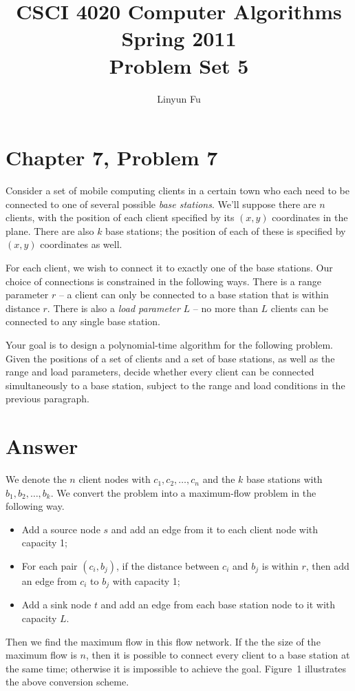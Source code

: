\documentclass[12pt,letterpaper]{article}
\author{Linyun Fu}
\title{CSCI 4020 Computer Algorithms Spring 2011\\
Problem Set 5}
\begin{document}
\maketitle
\section*{Chapter 7, Problem 7}
Consider a set of mobile computing clients in a certain town who each
need to be connected to one of several possible \emph{base stations}. We'll
suppose there are $n$ clients, with the position of each client specified
by its $(x, y)$ coordinates in the plane. There are also $k$ base stations; the
position of each of these is specified by $(x, y)$ coordinates as well.

For each client, we wish to connect it to exactly one of the base
stations. Our choice of connections is constrained in the following ways.
There is a range parameter $r$ -- a client can only be connected to a base
station that is within distance $r$. There is also a \emph{load parameter} $L$ -- no
more than $L$ clients can be connected to any single base station.

Your goal is to design a polynomial-time algorithm for the following
problem. Given the positions of a set of clients and a set of base stations,
as well as the range and load parameters, decide whether every client can
be connected simultaneously to a base station, subject to the range and
load conditions in the previous paragraph.

\section*{Answer}
We denote the $n$ client nodes with $c_1, c_2, \dots, c_n$ and the $k$ base stations with $b_1, b_2, \dots, b_k$. We convert the problem into a maximum-flow problem in the following way.
\begin{itemize}
\item Add a source node $s$ and add an edge from it to each client node with capacity 1;
\item For each pair $(c_i, b_j)$, if the distance between $c_i$ and $b_j$ is within $r$, then add an edge from $c_i$ to $b_j$ with capacity 1;
\item Add a sink node $t$ and add an edge from each base station node to it with capacity $L$.
\end{itemize}

Then we find the maximum flow in this flow network. If the the size of the maximum flow is $n$, then it is possible to connect every client to a base station at the same time; otherwise it is impossible to achieve the goal. Figure~1 illustrates the above conversion scheme.
\end{document}
